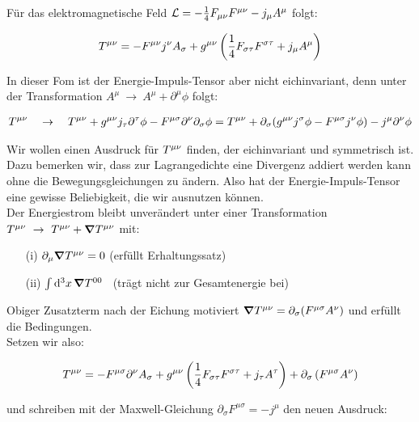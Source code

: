 Für das elektromagnetische Feld $\mathcal{L} = -\frac{1}{4} F_{\mu \nu} F^{\mu \nu} - j_{\mu}A^{\mu}$ folgt:

\begin{align}
T^{\mu\nu} = - F^{\mu \nu} j^{\nu}A_{\sigma}+g^{\mu\nu}\left( \frac{1}{4} F_{\sigma\tau}F^{\sigma\tau}+j_{\mu}A^{\mu}\right)
\end{align}

In dieser Fom ist der Energie-Impuls-Tensor aber nicht eichinvariant, denn unter der Transformation $A^{\mu} \ \rightarrow \ A^{\mu} + \partial^{\mu}\phi$ folgt:

\begin{align}
T^{\mu\nu} \quad \rightarrow \quad T^{\mu\nu} + g^{\mu\nu}j_{\tau}\partial^{\tau}\phi-F^{\mu\sigma}\partial^{\nu}\partial_{\sigma}\phi = T^{\mu\nu} + \partial_{\sigma}(g^{\mu\nu}j^{\sigma}\phi - F^{\mu\sigma}j^{\nu}\phi) - j^{\mu}\partial^{\nu}\phi
\end{align}

Wir wollen einen Ausdruck für $T^{\mu\nu}$ finden, der eichinvariant und symmetrisch ist. \\
Dazu bemerken wir, dass zur Lagrangedichte eine Divergenz addiert werden kann ohne die Bewegungsgleichungen zu ändern. Also hat der Energie-Impuls-Tensor eine gewisse Beliebigkeit, die wir ausnutzen können. \\
Der Energiestrom bleibt unverändert unter einer Transformation $T^{\mu\nu} \ \rightarrow \ T^{\mu\nu}+ \grad{T^{\mu\nu}}$ mit: 

\begin{enumerate}
\item[(i)] $\partial_{\mu}\grad{T^{\mu\nu}}=0$ \qquad (erfüllt Erhaltungssatz)
\item[(ii)] $ \int \dd[3]{x} \grad{T^{00}}$ \qquad \ (trägt nicht zur Gesamtenergie bei)
\end{enumerate}

Obiger Zusatzterm nach der Eichung motiviert $\grad{T^{\mu\nu}}=\partial_{\sigma}(F^{\mu\sigma}A^{\nu})$ und erfüllt die Bedingungen. \\
Setzen wir also:

\begin{align}
T^{\mu\nu} = -F^{\mu\sigma}\partial^{\nu}A_{\sigma} + g^{\mu\nu}\left( \frac{1}{4}F_{\sigma\tau}F^{\sigma\tau} + j_{\tau}A^{\tau} \right) + \partial_{\sigma} \left(F^{\mu\sigma}A^{\nu} \right)
\end{align}

und schreiben mit der Maxwell-Gleichung $\partial_{\sigma}F^{\mu\sigma}=-j^{\mu}$ den neuen Ausdruck:

